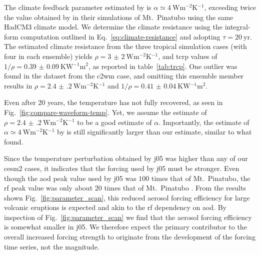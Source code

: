 \documentclass{ametsocV6.1}
\begin{document}
The climate feedback parameter estimated by \citet{jones2005} is \(\alpha \simeq
\SI{4}{\watt\metre^{-2}\kelvin^{-1}}\), exceeding twice the value obtained by
\citet{gregory2016} in their simulations of Mt.\ Pinatubo using the same HadCM3 climate
model. We determine the climate resistance using the integral-form computation outlined
in Eq.~\ref{eq:climate-resistance} and adopting \(\tau =\SI{20}{\mathrm{yr}}\). The
estimated climate resistance from the three tropical simulation cases (with four in each
ensemble) yields \(\rho =\SI{3(2)}{\watt\metre^{-2}\kelvin^{-1}}\), and \gls{tcrp}
values of \(1/\rho=\SI{0.39(9)}{\kelvin\watt^{-1}\metre^{2}}\), as reported in
table~\ref{tab:trcp}. One outlier was found in the dataset from the \gls{c2wm} case, and
omitting this ensemble member results in \(\rho
=\SI{2.4(2)}{\watt\metre^{-2}\kelvin^{-1}}\) and \(1/\rho
=\SI{0.41(4)}{\kelvin\watt^{-1}\metre^{2}}\).

Even after \(20\) years, the temperature has not fully recovered, as seen in
Fig.~\ref{fig:compare-waveform-temp}. Yet, we assume the estimate of \(\rho
=\SI{2.4(2)}{\watt\metre^{-2}\kelvin^{-1}}\) to be a good estimate of \(\alpha \).
Importantly, the estimate of \(\alpha \simeq \SI{4}{\watt\metre^{-2}\kelvin^{-1}}\) by
\citet{jones2005} is still significantly larger than our estimate, similar to what
\citet{gregory2016} found.

Since the temperature perturbation obtained by \gls{j05} was higher than any of our
\gls{cesm2} cases, it indicates that the forcing used by \gls{j05} must be stronger.
Even though the \gls{aod} peak value used by \gls{j05} was \(100\) times that of Mt.\
Pinatubo, the \gls{rf} peak value was only about \(20\) times that of Mt.\ Pinatubo
\citep{gregory2016}. From the results shown Fig.~\ref{fig:parameter_scan}, this reduced
aerosol forcing efficiency for large volcanic eruptions is expected and akin to the
\gls{rf} dependency on \gls{aod}. By inspection of Fig.~\ref{fig:parameter_scan} we find
that the aerosol forcing efficiency is somewhat smaller in \gls{j05}. We therefore
expect the primary contributor to the overall increased forcing strength to originate
from the development of the forcing time series, not the magnitude.
\end{document}
